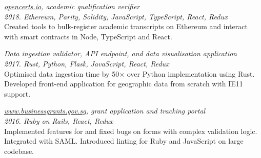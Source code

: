 \documentclass[line, margin]{res}
\begin{document}
\begin{resume}
        \textit{\href{https://opencerts.io/}{opencerts.io}, academic qualification verifier} \\
        \textit{2018. Ethereum, Parity, Solidity, JavaScript, TypeScript, React, Redux} \\
        Created tools to bulk-register academic transcripts on Ethereum and interact with smart contracts in Node, TypeScript and React.

        \textit{Data ingestion validator, API endpoint, and data visualisation application} \\
        \textit{2017. Rust, Python, Flask, JavaScript, React, Redux} \\
        Optimised data ingestion time by 50$\times$ over Python implementation using Rust.
        Developed front-end application for geographic data from scratch with IE11 support.

        \textit{\href{https://www.businessgrants.gov.sg/}{www.businessgrants.gov.sg}, grant application and tracking portal} \\
        \textit{2016. Ruby on Rails, React, Redux} \\
        Implemented features for and fixed bugs on forms with complex validation logic.
        Integrated with SAML.
        Introduced linting for Ruby and JavaScript on large codebase.





\end{resume}
\end{document}
